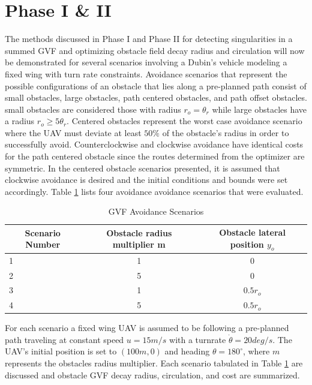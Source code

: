 \documentclass[numbered,pdftex]{ohio-etd}
\begin{document}
\section{Phase I \& II}

The methods discussed in Phase I and Phase II for detecting singularities in a summed GVF and optimizing obstacle field decay radius and circulation will now be demonstrated for several scenarios involving a Dubin's vehicle modeling a fixed wing with turn rate constraints. Avoidance scenarios that represent the possible configurations of an obstacle that lies along a pre-planned path consist of small obstacles, large obstacles, path centered obstacles, and path offset obstacles. small obstacles are considered those with radius $r_o = \theta_r$ while large obstacles have a radius $r_o\ge5\theta_r$. Centered obstacles represent the worst case avoidance scenario where the UAV must deviate at least $50\%$ of the obstacle's radius in order to successfully avoid. Counterclockwise and clockwise avoidance have identical costs for the path centered obstacle since the routes determined from the optimizer are symmetric. In the centered obstacle scenarios presented, it is assumed that clockwise avoidance is desired and the initial conditions and bounds were set accordingly. Table \ref{table:avoidanceScenarios} lists four avoidance avoidance scenarios that were evaluated.


\begin{table}[]
	\centering
	\caption{GVF Avoidance Scenarios}
	\label{table:avoidanceScenarios}
	\begin{tabular}{|l|c|c|}
		\hline
		\multicolumn{1}{|c|}{Scenario Number} & Obstacle radius multiplier m & Obstacle lateral position $y_o$    \\ \hline
		1                                     & 1 & 0     \\ \hline
		2                                     & 5 & 0     \\ \hline
		3                                     & 1 & $0.5r_o$ \\ \hline
		4                                     & 5 & $0.5r_o$ \\ \hline
	\end{tabular}
\end{table}




For each scenario a fixed wing UAV is assumed to be following a pre-planned path traveling at constant speed $u=15m/s$ with a turnrate $\dot{\theta}=20 deg/s$. The UAV's initial position is set to $(100m,0)$ and heading $\theta = 180^\circ$, where $m$ represents the obstacles radius multiplier. Each scenario tabulated in Table \ref{table:avoidanceScenarios} are discussed and obstacle GVF decay radius, circulation, and cost are summarized.\\
\end{document}
